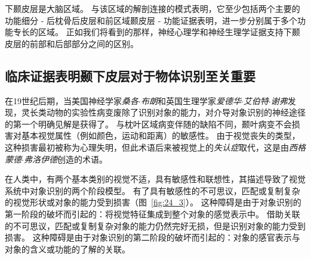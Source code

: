 下颞皮层是大脑区域。
与该区域的解剖连接的模式表明，它至少包括两个主要的功能细分 - 后枕骨后皮层和前区域颞皮层 - 功能证据表明，进一步分别属于多个功能专长的区域。
正如我们将看到的那样，神经心理学和神经生理学证据支持下颞皮层的前部和后部部分之间的区别。



\subsection{临床证据表明颞下皮层对于物体识别至关重要}

在19世纪后期，当美国神经学家\textit{桑各$\cdot$布朗}和英国生理学家\textit{爱德华$\cdot$艾伯特$\cdot$谢弗}发现，灵长类动物的实验性病变废除了识别对象的能力，对介导对象识别的神经途径的第一个明确见解是获得了。
与枕叶区域病变伴随的缺陷不同，颞叶病变不会损害对基本视觉属性（例如颜色，运动和距离）的敏感性。
由于视觉丧失的类型，这种损害最初被称为心理失明，但此术语后来被视觉上的\textit{失认症}取代，这是由\textit{西格蒙德$\cdot$弗洛伊德}创造的术语。


在人类中，有两个基本类别的视觉不适，具有敏感性和联想性，其描述导致了视觉系统中对象识别的两个阶段模型。
有了具有敏感性的不可思议，匹配或复制复杂的视觉形状或对象的能力受到损害（图~\ref{fig:24_3}）。
这种障碍是由于对象识别的第一阶段的破坏而引起的：将视觉特征集成到整个对象的感觉表示中。
借助关联的不可思议，匹配或复制复杂对象的能力仍然完好无损，但是识别对象的能力受到损害。
这种障碍是由于对象识别的第二阶段的破坏而引起的：对象的感官表示与对象的含义或功能的了解的关联。


